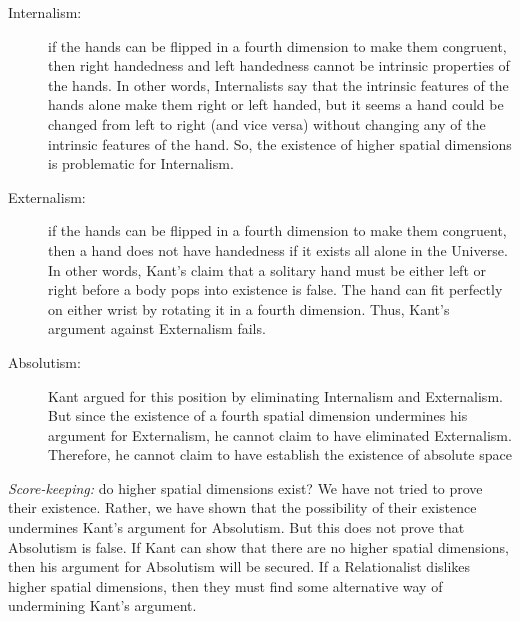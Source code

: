 \documentclass[oneside]{article}
\begin{document}
\begin{description}
\item[Internalism:]  if the hands can be flipped in a fourth dimension to make them congruent, then right handedness and left handedness cannot be intrinsic properties of the  hands. In other words, Internalists say that the intrinsic features of the hands alone make  them right or left handed, but it seems a hand could be changed from left to right (and vice versa) without changing any of the intrinsic features of the hand. So, the existence of higher spatial dimensions is problematic for Internalism.
\item[Externalism:] if the hands can be flipped in a fourth dimension to make them congruent, then 
a hand does not have handedness if it exists all alone in the Universe. In other words, Kant's claim that a solitary hand must be either left or right before a body pops into existence is false. The hand can fit perfectly on either wrist by rotating it in a fourth dimension. Thus, Kant's argument against Externalism fails. 

\item[Absolutism:] Kant argued for this position by eliminating Internalism and Externalism. But since the existence of a fourth spatial dimension undermines his argument for Externalism, he cannot claim to have eliminated Externalism. Therefore, he cannot claim to have establish the existence of absolute space 
\end{description}

\noindent \emph{Score-keeping:} do higher spatial dimensions exist? We have not tried to prove their existence. Rather, we have shown that the possibility of their existence undermines Kant's argument for Absolutism. But this does not prove that Absolutism is false. If Kant can show that there are no higher spatial dimensions, then his argument for Absolutism will be secured. If a Relationalist dislikes higher spatial dimensions, then they must find some alternative way of undermining Kant's argument. 
\end{document}
